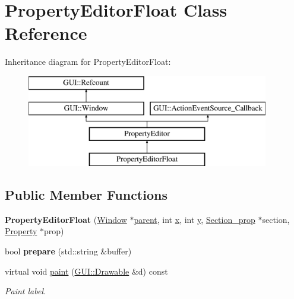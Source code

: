 \hypertarget{classPropertyEditorFloat}{\section{Property\-Editor\-Float Class Reference}
\label{classPropertyEditorFloat}
}
Inheritance diagram for Property\-Editor\-Float\-:\begin{figure}[H]
\begin{center}
\leavevmode
\includegraphics[height=4.000000cm]{classPropertyEditorFloat}
\end{center}
\end{figure}
\subsection*{Public Member Functions}
\begin{DoxyCompactItemize}
\item 
\hypertarget{classPropertyEditorFloat_a802ab5b49e83b39a3bafd825f7423f6f}{{\bfseries Property\-Editor\-Float} (\hyperlink{classGUI_1_1Window_ae828e9daa964dfc65a3550fb03117d30}{Window} $\ast$\hyperlink{classGUI_1_1Window_a2e593ff65e7702178d82fe9010a0b539}{parent}, int \hyperlink{classGUI_1_1Window_a6ca6a80ca00c9e1d8ceea8d3d99a657d}{x}, int \hyperlink{classGUI_1_1Window_a0ee8e923aff2c3661fc2e17656d37adf}{y}, \hyperlink{classSection__prop}{Section\-\_\-prop} $\ast$section, \hyperlink{classProperty}{Property} $\ast$prop)}\label{classPropertyEditorFloat_a802ab5b49e83b39a3bafd825f7423f6f}

\item 
\hypertarget{classPropertyEditorFloat_adbc9db52bdfd97df5ec2f62d3a59db87}{bool {\bfseries prepare} (std\-::string \&buffer)}\label{classPropertyEditorFloat_adbc9db52bdfd97df5ec2f62d3a59db87}

\item 
\hypertarget{classPropertyEditorFloat_a133735b95f2f539193c61d0abb21e766}{virtual void \hyperlink{classPropertyEditorFloat_a133735b95f2f539193c61d0abb21e766}{paint} (\hyperlink{classGUI_1_1Drawable}{G\-U\-I\-::\-Drawable} \&d) const }\label{classPropertyEditorFloat_a133735b95f2f539193c61d0abb21e766}

\begin{DoxyCompactList}\small\item\em Paint label. \end{DoxyCompactList}\end{DoxyCompactItemize}
